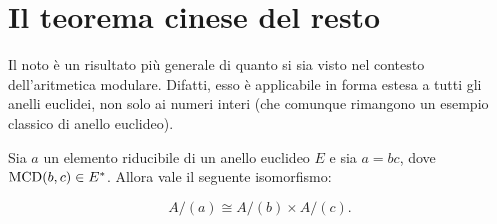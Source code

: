 \documentclass[11pt]{scrbook}
\begin{document}
\section{Il teorema cinese del resto}

    Il noto  è un risultato più generale di quanto
    si sia visto nel contesto dell'aritmetica modulare. Difatti, esso è
    applicabile in forma estesa a tutti gli anelli euclidei, non solo ai
    numeri interi (che comunque rimangono un esempio classico di anello euclideo). \\
    
    \begin{lemma}
        \label{lem:pre_cinese}

        Sia $a$ un elemento riducibile di un anello euclideo $E$ e
        sia $a=bc$, dove $\operatorname{MCD}(b, c) \in E^*$. Allora vale
        il seguente isomorfismo:
        
        \[ A/(a) \cong A/(b) \times A/(c). \]
    \end{lemma}
    
\end{document}
